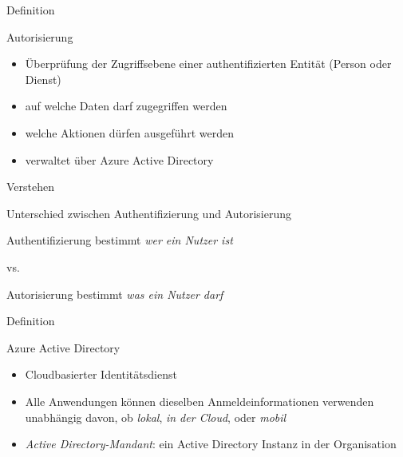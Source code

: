 \documentclass{scrartcl}
\newenvironment{flashcard}[2][]{%
    #1
    \vfill
    \centerline{\Large{#2}}
    \vfill
\newpage
}
{\newpage}
\begin{document}
    \begin{flashcard}[Definition]{Autorisierung}
        \begin{itemize}
            \item Überprüfung der Zugriffsebene einer authentifizierten Entität (Person oder Dienst)
            \item auf welche Daten darf zugegriffen werden
            \item welche Aktionen dürfen ausgeführt werden
            \item verwaltet über Azure Active Directory
        \end{itemize}
    \end{flashcard}

    \begin{flashcard}[Verstehen]{Unterschied zwischen Authentifizierung und Autorisierung}
        \begin{center}
            Authentifizierung bestimmt \emph{wer ein Nutzer ist}
            \vspace{5mm}

            vs.
            \vspace{5mm}

            Autorisierung bestimmt \emph{was ein Nutzer darf}
        \end{center}
    \end{flashcard}

    \begin{flashcard}[Definition]{Azure Active Directory}
        \begin{itemize}
            \item Cloudbasierter Identitätsdienst
            \item Alle Anwendungen können dieselben Anmeldeinformationen verwenden\newline
            unabhängig davon, ob \emph{lokal}, \emph{in der Cloud}, oder \emph{mobil}
            \item \emph{Active Directory-Mandant}: ein Active Directory Instanz in der Organisation
        \end{itemize}
    \end{flashcard}
\end{document}

